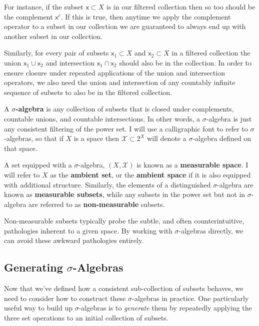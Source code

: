 \documentclass[
  letterpaper,
  DIV=11,
  numbers=noendperiod]{scrartcl}
\begin{document}
For instance, if the subset \(\mathsf{x} \subset X\) is in our filtered
collection then so too should be the complement \(\mathsf{x}^{c}\). If
this is true, then anytime we apply the complement operator to a subset
in our collection we are guaranteed to always end up with another subset
in our collection.

Similarly, for every pair of subsets \(\mathsf{x}_{1} \subset X\) and
\(\mathsf{x}_{2} \subset X\) in a filtered collection the union
\(\mathsf{x}_{1} \cup \mathsf{x}_{2}\) and intersection
\(\mathsf{x}_{1} \cap \mathsf{x}_{2}\) should also be in the collection.
In order to ensure closure under repeated applications of the union and
intersection operators, we also need the union and intersection of any
countably infinite sequence of subsets to also be in the filtered
collection.

A \textbf{\(\sigma\)-algebra} is any collection of subsets that is
closed under complements, countable unions, and countable intersections.
In other words, a \(\sigma\)-algebra is just any consistent filtering of
the power set. I will use a calligraphic font to refer to
\(\sigma\)-algebras, so that if \(X\) is a space then
\(\mathcal{X} \subset 2^{X}\) will denote a \(\sigma\)-algebra defined
on that space.

A set equipped with a \(\sigma\)-algebra, \((X, \mathcal{X})\) is known
as a \textbf{measurable space}. I will refer to \(X\) as the
\textbf{ambient set}, or the \textbf{ambient space} if it is also
equipped with additional structure. Similarly, the elements of a
distinguished \(\sigma\)-algebra are known as \textbf{measurable
subsets}, while any subsets in the power set but not in
\(\sigma\)-algebra are referred to as \textbf{non-measurable} subsets.

Non-measurable subsets typically probe the subtle, and often
counterintuitive, pathologies inherent to a given space. By working with
\(\sigma\)-algebras directly, we can avoid these awkward pathologies
entirely.

\subsection{\texorpdfstring{Generating
{\(\sigma\)}-Algebras}{Generating \textbackslash sigma-Algebras}}\label{generating-sigma-algebras}

Now that we've defined how a consistent sub-collection of subsets
behaves, we need to consider how to construct these \(\sigma\)-algebras
in practice. One particularly useful way to build up \(\sigma\)-algebras
is to \emph{generate} them by repeatedly applying the three set
operations to an initial collection of subsets.
\end{document}
